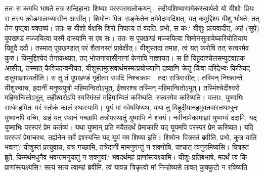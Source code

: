 \vakya ततः स कमधि भाषते तत्र सन्दिहानाः शिष्याः परस्परमालोकयन्।
\vakya तदीयशिष्याणामेकस्त्वर्थतो यो यीशोः प्रियः स तस्य क्रोडमालम्ब्यासीन आसीत्।
\vakya शिमोनः पित्रः सङ्केतेन तमेवेदमादिशत्, यत् कमुद्दिश्य यीशु र्भाषते, तत् तेन पृष्ट्वा वक्तव्यं।
\vakya ततः स यीशो र्वक्षसि शिरो निपात्य तं वदति, प्रभो, स कः?
\vakya यीशुः प्रत्यवादीत्, अहं (सूपे) पूपखण्डं मज्जयित्वा यस्मै दास्यामि स एव सः। ततः स पूपखण्डं मज्जयित्वा शिमोनसुतायेष्करियोतियाय यिहूदै ददौ।
\vakya तस्मात् पूपखण्डात् परं शैतानस्तं प्रावेक्षीत्। यीशुस्तदा तमाह, त्वं यत् करोषि तत् सत्वरमेव कुरु।
\vakya किमुद्दिश्येदं तेनाकथ्यत, तद् भोजनायासीनानां केनापि नाज्ञायत।
\vakya स हि यिहूदाश्चेलसम्पुटवाहक आसीत्, तस्मात् कैश्चिदन्वमीयत, यीशुस्तमुत्सवार्थमस्मत्प्रयोज्यानि द्रव्याणि क्रेतुं किंवा दरिद्रेभ्यः किञ्चिद् दातुमाज्ञापयतीति।
\vakya स तु तं पूपखण्डं गृहीत्वा सपदि निश्चक्राम। तदा रात्रिरासीत्।
\vakya तस्मिन् निष्क्रान्ते यीशुरुवाच, इदानीं मनुष्यपुत्रो महिमान्वितोऽभूत्, ईश्वरश्च तस्मिन् महिमान्वितोऽभूत्।
\vakya तस्मिंश्चेदीश्वरो महिमान्वितोऽभूत्, तर्हीश्वरोऽपि स्वस्मिंस्तं महिमान्वितं करिष्यति, सत्वरमेव करिष्यति।
\vakya वत्साः, युष्माभिः सार्धमहमितः परं स्तोकं कालं स्थास्यामि। यूयं मां गवेषयिष्यथ, यथा तु यिहूदीयानहमुक्तवांस्तथाधुना युष्मानपि वच्मि, अहं यत् स्थानं गच्छामि तत्रोपस्थातुं युष्माभि र्न शक्यं।
\vakya नवीनामेकामाज्ञां युष्मभ्यं ददामि, यद् युष्माभिः परस्परं प्रेम कर्तव्यं। यथा युष्मान् प्रति मयैतदर्थं प्रेमाकारि यद् यूयमपि परस्परं प्रेम करिष्यत।
\vakya यदि परस्परं प्रेमाचरथ, तर्ह्यनेन सर्वे ज्ञास्यन्ति यद् यूयं मम शिष्या इति।
\vakya शिमोनः पित्रस्तं ब्रवीति, प्रभो, कुत्र याति भवान्? यीशुस्तं प्रत्युवाच, यत्र गच्छामि, तत्रेदानीं मामनुगन्तुं न शक्नोषि, पश्चात् त्वनुगमिष्यसि।
\vakya पित्रस्तं ब्रूते, किमर्थमधुनैव भवन्तमनुयातुं न शक्नुयां? भवदर्थमहं प्राणांस्त्यक्ष्यामि।
\vakya यीशुः प्रतिबभाषे, मदर्थं त्वं किं प्राणांस्त्यक्ष्यसि? सत्यं सत्यं त्वामहं ब्रवीमि, त्वं यावन्न त्रिकृत्वो मां निन्होष्यसे तावत् कुक्कुटो न रविष्यति\eoc